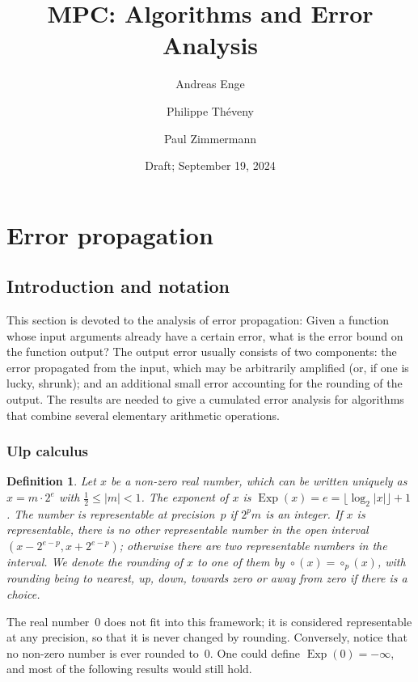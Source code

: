 \documentclass [11pt]{article}
\title {MPC: Algorithms and Error Analysis}
\author {Andreas Enge \and Philippe Th\'eveny \and Paul Zimmermann}
\date {Draft; September 19, 2024}
\DeclareMathOperator{\Exp}{\operatorname {Exp}}
\newcommand {\round}{\operatorname {\circ}}
\newtheorem{definition}[theorem]{Definition}
\begin{document}
\maketitle
\tableofcontents


\section {Error propagation}

\subsection {Introduction and notation}

This section is devoted to the analysis of error propagation: Given a function
whose input arguments already have a certain error, what is the error bound on
the function output? The output error usually consists of two components: the
error propagated from the input, which may be arbitrarily amplified (or, if
one is lucky, shrunk); and an
additional small error accounting for the rounding of the output. The results
are needed to give a cumulated error analysis for algorithms that combine
several elementary arithmetic operations.


\subsubsection {Ulp calculus}

\begin {definition}
\label {def:exp}
Let $x$ be a non-zero real number, which can be written uniquely as
$x = m \cdot 2^e$ with $\frac{1}{2} \le |m| < 1$.
The {\em exponent} of $x$ is
$\Exp(x) = e = \lfloor \log_2 |x| \rfloor + 1$.
The number is {\em representable at precision~$p$} if
$2^p m$ is an integer.
If $x$ is representable, there is no other representable number in the
open interval $(x - 2^{e-p}, x + 2^{e-p})$; otherwise there are two
representable numbers in the interval.
We denote the rounding of $x$ to one of them by
$\round (x) = \round_p (x)$, with rounding being to nearest, up, down,
towards zero or away from zero if there is a choice.
\end {definition}

The real number~$0$ does not fit into this framework; it is considered
representable at any precision, so that it is never changed by rounding.
Conversely, notice that no non-zero number is ever rounded to~$0$.
One could define $\Exp(0) = -\infty$, and most of the following results
would still hold.
\end{document}
